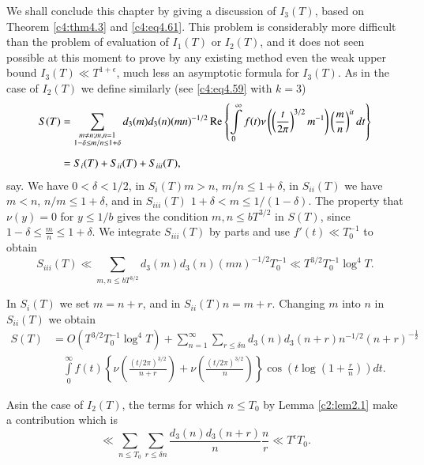 We shall conclude this chapter by giving a discussion of $I_3 (T)$,
based on Theorem \ref{c4:thm4.3} and \eqref{c4:eq4.61}. This problem
is considerably more difficult than the problem of evaluation of $I_1
(T)$ or $I_2 (T)$, and it does not seen possible at this moment to
prove by any existing method even the weak upper bound $I_3 (T) \ll
T^{1+\epsilon}$, much less an asymptotic formula for $I_3 (T)$. As in
the case of $I_2(T)$ we define similarly (see \eqref{c4:eq4.59} with
$k=3$)
{\fontsize{10pt}{12pt}\selectfont
\begin{align*}
  S(T) & = \sum_{\substack{m \neq n; m,n=1\\1-\delta \leq m/n \leq 1+
      \delta}} d_3 (m) d_3 (n) (mn)^{-1/2}
\operatorname{Re}
  \left\{\int\limits_0^\infty f(t) \nu \left(
  \left(\frac{t}{2\pi}\right)^{3/2}m^{-1} \right) \left(\frac{m}{n}
  \right)^{it}dt \right\}\\[5pt]
  & = S_i (T) + S_{ii}(T) + S_{iii}(T),
\end{align*}}
say. We have $0 < \delta < 1/2$, in $S_i(T) m> n$, $m/n \leq 1+
\delta$, in $S_{ii} (T)$ we have $m<n$, $n/m \leq 1+ \delta$, and in
$S_{iii}(T)$ $1+ \delta < m \leq 1/(1-\delta)$. The property that $\nu
(y) =0$ for $y \leq 1/b$ gives the condition $m, n \leq bT^{3/2}$ in
$S(T)$, since $1- \delta \leq \frac{m}{n} \leq 1+ \delta$. We
integrate $S_{iii}(T)$ by parts and use $f'(t) \ll T_0^{-1}$ to obtain 
$$
S_{iii} (T) \ll \sum_{m, n \leq bT^{3/2}} d_3 (m) d_3 (n) (mn)^{-1/2}
T_0^{-1} \ll T^{3/2} T_0^{-1} \log^4 T. 
$$

In $S_i (T)$ we set $m=n +r$, and in $S_{ii}(T)n= m+r$. Changing $m$
into $n$ in $S_{ii}(T)$ we obtain
\begin{align*}
  S(T) & = O(T^{3/2}T_0^{-1} \log^4 T)+ \sum_{n=1}^\infty \sum_{r \leq
    \delta n} d_3 (n) d_3 (n+r)n^{-1/2} (n+r)^{-\frac{1}{2}}\\
  &\quad \int\limits_0^\infty f(t) \left\{\nu
  \left(\frac{(t/2\pi)^{3/2}}{n+r} \right) + \nu
  \left(\frac{(t/2\pi)^{3/2}}{n} \right) \right\} \cos (t \log (1+
  \frac{r}{n}))dt. 
\end{align*}

As\pageoriginale in the case of $I_2 (T)$, the terms for which $n \leq
T_0$ by Lemma \ref{c2:lem2.1} make a contribution which is 
$$
\ll \sum_{n \leq T_0} \sum_{r \leq \delta n} \frac{d_3 (n) d_3
  (n+r)}{n} \frac{n}{r} \ll T^\epsilon T_0.
$$

